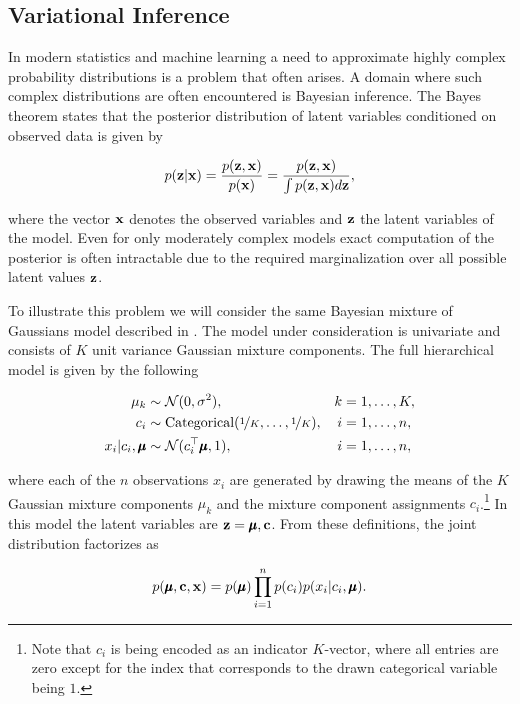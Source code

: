 \subsection{Variational Inference}
\label{subsection:variational_inference}

In modern statistics and machine learning a need to approximate highly complex probability distributions is a problem that often arises. A domain where such complex distributions are often encountered is Bayesian inference. The Bayes theorem states that the posterior distribution of latent variables conditioned on observed data is given by

$$p(\mathbf{z} \vert \mathbf{x}) = \frac{p(\mathbf{z}, \mathbf{x})}{p(\mathbf{x})} = \frac{p(\mathbf{z}, \mathbf{x})}{\int p(\mathbf{z}, \mathbf{x}) d\mathbf{z}},$$

where the vector $\mathbf{x}$ denotes the observed variables and $\mathbf{z}$ the latent variables of the model. Even for only moderately complex models exact computation of the posterior is often intractable due to the required marginalization over all possible latent values $\mathbf{z}$.

To illustrate this problem we will consider the same Bayesian mixture of Gaussians model described in \cite{variational_inference_review}. The model under consideration is univariate and consists of $K$ unit variance Gaussian mixture components. The full hierarchical model is given by the following

\begin{align*}
\mu_k                       &\sim \mathcal{N}(0, \sigma^2),                                     & k &= 1, \dotsc, K,\\
c_i                         &\sim \text{Categorical}(\nicefrac{1}{K}, \dotsc, \nicefrac{1}{K}), & i &= 1, \dotsc, n,\\
x_i \vert c_i, \pmb{\mu} &\sim \mathcal{N}(c^{\top}_i \pmb{\mu}, 1),                      & i &= 1, \dotsc, n,
\end{align*}

where each of the $n$ observations $x_i$ are generated by drawing the means of the $K$ Gaussian mixture components $\mu_k$ and the mixture component assignments $c_i$.\footnote{Note that $c_i$ is being encoded as an indicator $K$-vector, where all entries are zero except for the index that corresponds to the drawn categorical variable being $1$.} In this model the latent variables are $\mathbf{z} = {\pmb{\mu}, \mathbf{c}}$. From these definitions, the joint distribution factorizes as

$$p(\pmb{\mu}, \mathbf{c}, \mathbf{x}) = p(\pmb{\mu}) \prod_{i=1}^{n} p(c_i) p(x_i \vert c_i, \pmb{\mu}).$$

